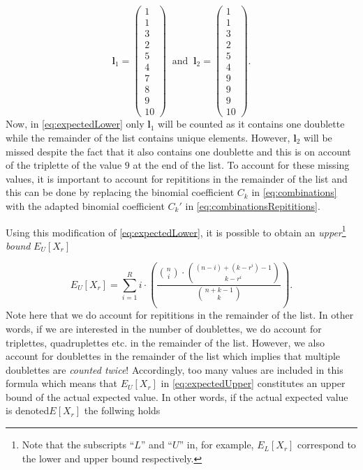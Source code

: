 \documentclass{article}
\begin{document}
$$\mathbf{l}_1=\begin{pmatrix}1\\ 1\\ 3\\ 2\\ 5\\ 4\\7\\8\\9\\10\end{pmatrix}\;\;\textrm{and}\;\;\mathbf{l}_2=\begin{pmatrix}1\\ 1\\ 3\\ 2\\ 5\\ 4\\9\\9\\9\\10\end{pmatrix}.$$
Now, in \eqref{eq:expectedLower} only $\mathbf{l}_1$ will be counted as it contains one doublette while the remainder of the list contains unique elements. However, $\mathbf{l}_2$ will be missed despite the fact that it also contains one doublette and this is on account of the triplette of the value $9$ at the end of the list. To account for these missing values, it is important to account for repititions in the remainder of the list and this can be done by replacing the binomial coefficient $C_k$ in \eqref{eq:combinations} with the adapted binomial coefficient $C_k'$ in \eqref{eq:combinationsRepititions}. 

Using this modification of \eqref{eq:expectedLower}, it is possible to obtain an \textit{upper}\footnote{Note that the subscripts ``$L$'' and ``$U$'' in, for example, $E_L[X_r]$ correspond to the lower and upper bound respectively.} \textit{bound} $E_U[X_r]$ 


\begin{equation}
  E_U[X_r]=\displaystyle\sum_{i=1}^R i\cdot\left(\dfrac{{n\choose i}\cdot{(n-i)+(k-r^i)-1\choose k-r^i}}{{n+k-1\choose k}}\right).
  \label{eq:expectedUpper}
  \end{equation}
Note here that we do account for repititions in the remainder of the list. In other words, if we are interested in the number of doublettes, we do account for triplettes, quadruplettes etc. in the remainder of the list. However, we also account for doublettes in the remainder of the list which implies that multiple doublettes are \textit{counted twice}! Accordingly, too many values are included in this formula which means that $E_U[X_r]$ in \eqref{eq:expectedUpper} constitutes an upper bound of the actual expected value. In other words, if the actual expected value is denoted$E[X_r]$ the follwing holds
\end{document}
